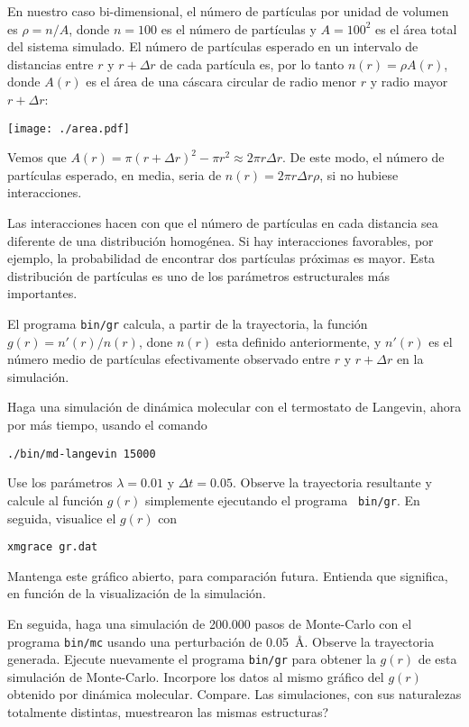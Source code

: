 \documentclass[10pt,a4paper,ssfamily]{exam}
\newcommand{\1}{{\bf 1}}
\newcommand{\2}{{\bf 2}}
\newcommand{\3}{{\bf 3}}
\newcommand{\command}[1]{\begin{center}{\tt #1}\end{center}}
\begin{document}
En nuestro caso bi-dimensional, el número de partículas por unidad de
volumen es $\rho=n/A$, donde $n=100$ es el número de partículas y $A=100^2$
es el área total del sistema simulado. El número de partículas esperado
en un intervalo de distancias entre $r$ y $r+\Delta r$ de cada partícula
es, por lo tanto $n(r)=\rho A(r)$, donde $A(r)$ es el área de una cáscara
circular de radio menor $r$ y radio mayor $r+\Delta r$:
\begin{center}
\texttt{[image: ./area.pdf]}
\end{center}
Vemos que $A(r)=\pi (r+\Delta r)^2 - \pi r^2 \approx 2\pi r\Delta r$.
De este modo, el número de partículas esperado, en media, seria de 
$n(r)=2\pi r\Delta r\rho$, si no hubiese interacciones. 

Las interacciones hacen con que el número de partículas en cada
distancia sea diferente de una distribución homogénea. Si hay
interacciones favorables, por ejemplo, la probabilidad de encontrar dos
partículas próximas es mayor. Esta distribución de partículas es uno de
los parámetros estructurales más importantes.

El programa {\tt bin/gr} calcula, a partir de la trayectoria, la función
$g(r)=n'(r)/n(r)$, done $n(r)$ esta definido anteriormente, y $n'(r)$ es
el número medio de partículas efectivamente observado entre $r$ y $r+\Delta r$
en la simulación. 

Haga una simulación de dinámica molecular con el termostato de Langevin,
ahora por más tiempo, 
usando el comando 
\command{./bin/md-langevin 15000}
Use los parámetros
$\lambda=0.01$ y $\Delta t=0.05$. Observe la trayectoria resultante y
calcule al función $g(r)$ simplemente ejecutando el programa {\tt
bin/gr}. En seguida, visualice el $g(r)$ con
\command{xmgrace gr.dat} 
Mantenga este gráfico abierto, para comparación futura. Entienda que
significa, en función de la visualización de la simulación. 

En seguida, haga una simulación de 200.000 pasos de Monte-Carlo con el programa 
{\tt bin/mc} usando una perturbación de 0.05~\AA. Observe la trayectoria
generada. Ejecute nuevamente el
programa {\tt bin/gr} para obtener la $g(r)$ de esta simulación de
Monte-Carlo. Incorpore los datos al mismo gráfico del $g(r)$ obtenido
por dinámica molecular. Compare. Las simulaciones, con sus naturalezas
totalmente distintas, muestrearon las mismas estructuras?  
\end{document}
